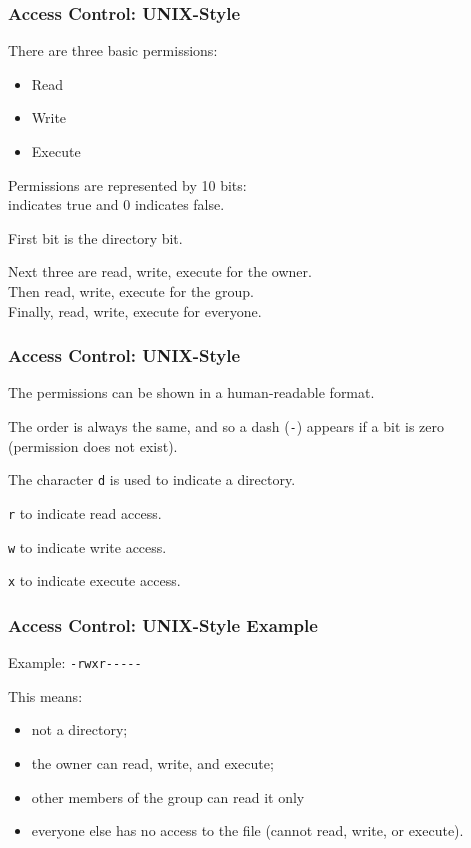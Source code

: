 \begin{frame}
	\frametitle{Access Control: UNIX-Style}


	There are three basic permissions:

	\begin{itemize}
		\item Read
		\item Write
		\item Execute
	\end{itemize}

	Permissions are represented by 10 bits:\\
	 indicates true and 0 indicates false.

	First bit is the directory bit.

	Next three are read, write, execute for the owner.\\
	Then read, write, execute for the group.\\
	Finally, read, write, execute for everyone.


\end{frame}

\begin{frame}
	\frametitle{Access Control: UNIX-Style}


	The permissions can be shown in a human-readable format.

	The order is always the same, and so a dash (\texttt{-}) appears if a bit is zero (permission does not exist).

	The character \texttt{d} is used to indicate a directory.

	\texttt{r} to indicate read access.

	\texttt{w} to indicate write access.

	\texttt{x} to indicate execute access.



\end{frame}

\begin{frame}
	\frametitle{Access Control: UNIX-Style Example}


	Example: \texttt{-rwxr{-}{-}{-}{-}{-}}

	This means:
	\begin{itemize}
		\item not a directory;
		\item the owner can read, write, and execute;
		\item other members of the group can read it only
		\item everyone else has no access to the file (cannot read, write, or execute).
	\end{itemize}


\end{frame}

